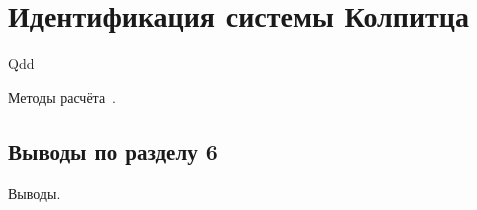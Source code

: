 \chapter{Идентификация системы Колпитца}

Qdd

Методы расчёта~\cite{zaeplnii_radio_calc}.

\section{Выводы по разделу 6}

Выводы.

